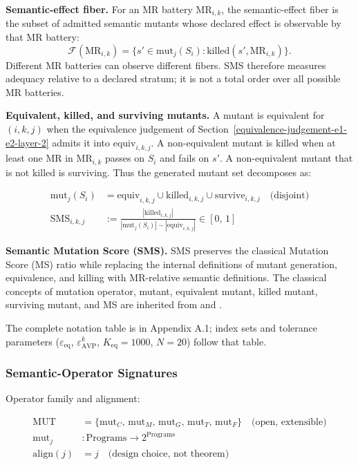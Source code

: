\documentclass[manuscript,screen,review]{acmart}
\begin{document}
\textbf{Semantic-effect fiber.} For an MR battery \(\mathrm{MR}_{i,k}\),
the semantic-effect fiber is the subset of admitted semantic mutants
whose declared effect is observable by that MR battery:
\[
  \mathcal{F}(\mathrm{MR}_{i,k}) =
  \{s' \in \mathrm{mut}_j(S_i): \mathrm{killed}(s', \mathrm{MR}_{i,k})\}.
\]
Different MR batteries can observe different fibers. SMS therefore
measures adequacy relative to a declared stratum; it is not a total order
over all possible MR batteries.

\textbf{Equivalent, killed, and surviving mutants.} A mutant is
equivalent for \((i,k,j)\) when the equivalence judgement of Section~\ref{equivalence-judgement-e1-e2-layer-2} admits
it into \(\mathrm{equiv}_{i,k,j}\). A non-equivalent mutant is killed when
at least one MR in \(\mathrm{MR}_{i,k}\) passes on \(S_i\) and fails on
\(s'\). A non-equivalent mutant that is not killed is surviving. Thus
the generated mutant set decomposes as:

\begin{align*}
\mathrm{mut}_j(S_i) &= \mathrm{equiv}_{i,k,j} \cup \mathrm{killed}_{i,k,j} \cup \mathrm{survive}_{i,k,j} \quad \text{(disjoint)} \\
\mathrm{SMS}_{i,k,j} &:= \frac{|\mathrm{killed}_{i,k,j}|}{|\mathrm{mut}_j(S_i)| - |\mathrm{equiv}_{i,k,j}|} \in [0,\,1]
\end{align*}

\textbf{Semantic Mutation Score (SMS).} SMS preserves the classical
Mutation Score (MS) ratio while replacing the internal definitions of
mutant generation, equivalence, and killing with MR-relative semantic
definitions. The classical concepts of mutation operator, mutant,
equivalent mutant, killed mutant, surviving mutant, and MS are inherited
from \citet{jia2011analysis} and
\citet{ammann2008introduction}.

The complete notation table is in Appendix A.1; index sets and tolerance
parameters ($\varepsilon_{\mathrm{eq}}$, $\varepsilon_{\mathrm{AVP}}^k$,
$K_{\mathrm{eq}} = 1000$, $N = 20$) follow that table.

\subsubsection{Semantic-Operator Signatures}\label{operator-signatures}

Operator family and alignment:

\begin{align*}
\mathrm{MUT} &= \{\mathrm{mut}_C,\, \mathrm{mut}_M,\, \mathrm{mut}_G,\, \mathrm{mut}_T,\, \mathrm{mut}_F\} \quad \text{(open, extensible)} \\
\mathrm{mut}_j &: \text{Programs} \to 2^{\text{Programs}} \\
\mathrm{align}(j) &= j \quad \text{(design choice, not theorem)}
\end{align*}
\end{document}
